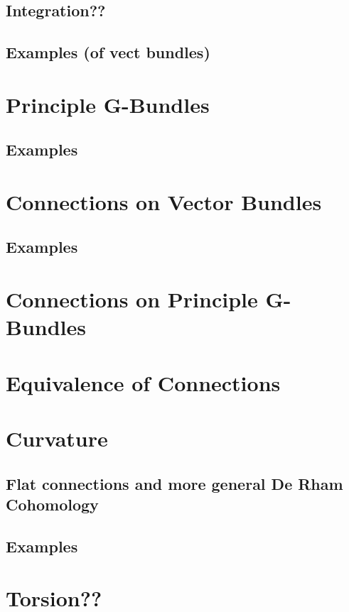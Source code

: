 \documentclass[a4paper]{article}
\theoremstyle{definition} \newtheorem*{definition}{Definition}
\theoremstyle{definition} \newtheorem*{definitions}{Definitions}
\theoremstyle{plain} \newtheorem{theorem}{Theorem}[section]
\theoremstyle{plain} \newtheorem{proposition}[theorem]{Proposition}
\theoremstyle{plain} \newtheorem{corollary}[theorem]{Corollary}
\theoremstyle{plain} \newtheorem{lemma}[theorem]{Lemma}
\theoremstyle{plain} \newtheorem{example}[theorem]{Example}
\begin{document}
\subsection{Integration??}

\subsection{Examples (of vect bundles)}

\section{Principle G-Bundles}

\subsection{Examples}

\section{Connections on Vector Bundles}

\subsection{Examples}

\section{Connections on Principle G-Bundles}

\section{Equivalence of Connections}

\section{Curvature}

\subsection{Flat connections and more general De Rham Cohomology}

\subsection{Examples}

\section{Torsion??}
\end{document}

